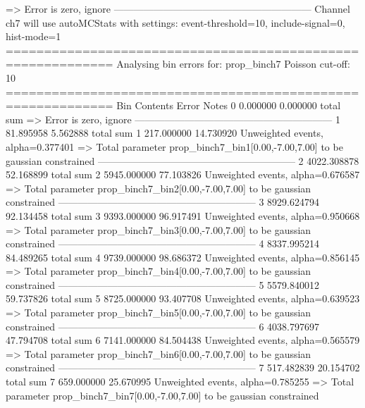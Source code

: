   => Error is zero, ignore      
------------------------------------------------------------
Channel ch7 will use autoMCStats with settings: event-threshold=10, include-signal=0, hist-mode=1
============================================================
Analysing bin errors for: prop_binch7
Poisson cut-off: 10
============================================================
Bin        Contents        Error           Notes                         
0          0.000000        0.000000        total sum                     
  => Error is zero, ignore      
------------------------------------------------------------
1          81.895958       5.562888        total sum                     
1          217.000000      14.730920       Unweighted events, alpha=0.377401
  => Total parameter prop_binch7_bin1[0.00,-7.00,7.00] to be gaussian constrained
------------------------------------------------------------
2          4022.308878     52.168899       total sum                     
2          5945.000000     77.103826       Unweighted events, alpha=0.676587
  => Total parameter prop_binch7_bin2[0.00,-7.00,7.00] to be gaussian constrained
------------------------------------------------------------
3          8929.624794     92.134458       total sum                     
3          9393.000000     96.917491       Unweighted events, alpha=0.950668
  => Total parameter prop_binch7_bin3[0.00,-7.00,7.00] to be gaussian constrained
------------------------------------------------------------
4          8337.995214     84.489265       total sum                     
4          9739.000000     98.686372       Unweighted events, alpha=0.856145
  => Total parameter prop_binch7_bin4[0.00,-7.00,7.00] to be gaussian constrained
------------------------------------------------------------
5          5579.840012     59.737826       total sum                     
5          8725.000000     93.407708       Unweighted events, alpha=0.639523
  => Total parameter prop_binch7_bin5[0.00,-7.00,7.00] to be gaussian constrained
------------------------------------------------------------
6          4038.797697     47.794708       total sum                     
6          7141.000000     84.504438       Unweighted events, alpha=0.565579
  => Total parameter prop_binch7_bin6[0.00,-7.00,7.00] to be gaussian constrained
------------------------------------------------------------
7          517.482839      20.154702       total sum                     
7          659.000000      25.670995       Unweighted events, alpha=0.785255
  => Total parameter prop_binch7_bin7[0.00,-7.00,7.00] to be gaussian constrained

